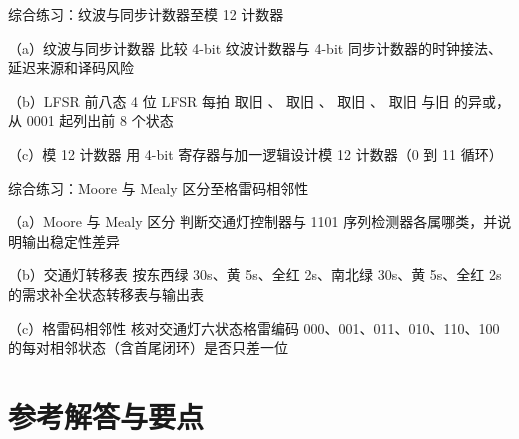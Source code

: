 \begin{chapterexercise}{综合练习：纹波与同步计数器至模 12 计数器}
\begin{exercisesubproblem}{（a）纹波与同步计数器}
比较 4-bit 纹波计数器与 4-bit 同步计数器的时钟接法、延迟来源和译码风险
\end{exercisesubproblem}
\begin{exercisesubproblem}{（b）LFSR 前八态}
4 位 LFSR 每拍  取旧 、 取旧 、 取旧 、 取旧  与旧  的异或，从 0001 起列出前 8 个状态
\end{exercisesubproblem}
\begin{exercisesubproblem}{（c）模 12 计数器}
用 4-bit 寄存器与加一逻辑设计模 12 计数器（0 到 11 循环）
\end{exercisesubproblem}
\end{chapterexercise}

\begin{chapterexercise}{综合练习：Moore 与 Mealy 区分至格雷码相邻性}
\begin{exercisesubproblem}{（a）Moore 与 Mealy 区分}
判断交通灯控制器与 1101 序列检测器各属哪类，并说明输出稳定性差异
\end{exercisesubproblem}
\begin{exercisesubproblem}{（b）交通灯转移表}
按东西绿 30s、黄 5s、全红 2s、南北绿 30s、黄 5s、全红 2s 的需求补全状态转移表与输出表
\end{exercisesubproblem}
\begin{exercisesubproblem}{（c）格雷码相邻性}
核对交通灯六状态格雷编码 000、001、011、010、110、100 的每对相邻状态（含首尾闭环）是否只差一位
\end{exercisesubproblem}
\end{chapterexercise}

\section*{参考解答与要点}


